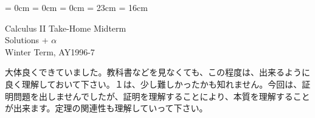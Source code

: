 

\topmargin = 0cm
\oddsidemargin = 0cm \evensidemargin = 0cm
\textheight = 23cm \textwidth = 16cm

\pagestyle{empty}

\newcommand{\sol}{{\gt 解答：}}
\newcommand{\note}{{\gt 注：}}


\begin{center}
{\gt\LARGE Calculus II  Take-Home Midterm\\
Solutions + $\alpha$}\\
{\gt Winter Term, AY1996-7}
\end{center}

\bigskip
\noindent
大体良くできていました。教科書などを見なくても、この程度は、出来るように良く理解しておいて下さい。１は、少し難しかったかも知れません。今回は、証明問題を出しませんでしたが、証明を理解することにより、本質を理解することが出来ます。定理の関連性も理解していって下さい。

